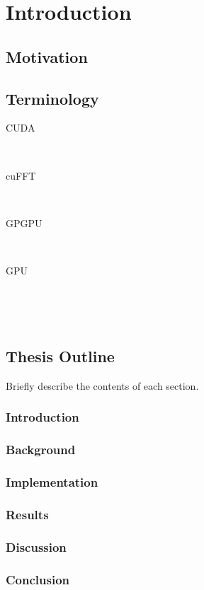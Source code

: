 \chapter{Introduction}
\section{Motivation}

\section{Terminology}
\begin{description}
	\item[CUDA] \hfill \\
	\item[cuFFT] \hfill \\
	\item[GPGPU] \hfill \\
	\item[GPU] \hfill \\
	\item[] \hfill \\
\end{description}
\section{Thesis Outline}
Briefly describe the contents of each section.
\subsection{Introduction}
\subsection{Background}
\subsection{Implementation}
\subsection{Results}
\subsection{Discussion}
\subsection{Conclusion}